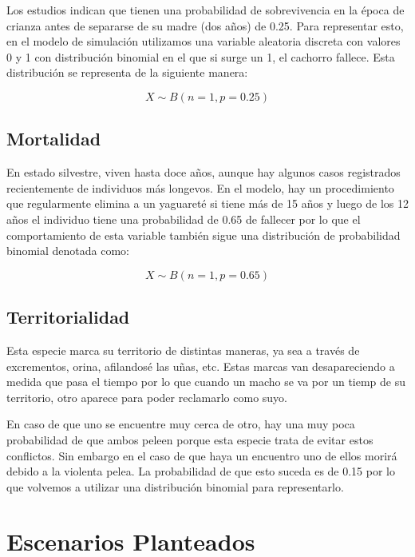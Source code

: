             Los estudios indican que tienen una probabilidad de sobrevivencia en la época de crianza antes de separarse de su madre (dos años) de 0.25. Para representar esto, en el modelo de simulación utilizamos una variable aleatoria discreta con valores 0 y 1 con distribución binomial en el que si surge un 1, el cachorro fallece. Esta distribución se representa de la siguiente manera:

            \begin{equation}
                X \sim B(n=1, p=0.25)
            \end{equation}
            
    \subsection{Mortalidad}
        En estado silvestre, viven hasta doce años, aunque hay algunos casos registrados recientemente de individuos más longevos. En el modelo, hay un procedimiento que regularmente elimina a un yaguareté si tiene más de 15 años y luego de los 12 años el individuo tiene una probabilidad de 0.65 de fallecer por lo que el comportamiento de esta variable también sigue una distribución de probabilidad binomial denotada como:
        
        \begin{equation}
            X \sim B(n=1, p=0.65)
        \end{equation}

    \subsection{Territorialidad}
        Esta especie marca su territorio de distintas maneras, ya sea a través de excrementos, orina, afilandosé las uñas, etc. Estas marcas van desapareciendo a medida que pasa el tiempo por lo que cuando un macho se va por un tiemp de su territorio, otro aparece para poder reclamarlo como suyo.
        
        En caso de que uno se encuentre muy cerca de otro, hay una muy poca probabilidad de que ambos peleen porque esta especie trata de evitar estos conflictos. Sin embargo en el caso de que haya un encuentro uno de ellos morirá debido a la violenta pelea.
        La probabilidad de que esto suceda es de 0.15 por lo que volvemos a utilizar una distribución binomial para representarlo.
        
\section{Escenarios Planteados}
